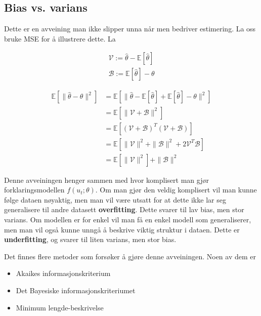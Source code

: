 \subsection{Bias vs. varians}
Dette er en avveining man ikke slipper unna når men bedriver estimering. La oss bruke MSE for å illustrere dette. La 

\begin{equation}
\begin{array}{l}{\mathcal{V}:=\widehat{\theta}-\mathbb{E}[\widehat{\theta}]} \\ {\mathcal{B}:=\mathbb{E}[\widehat{\theta}]-\theta}\end{array}
\end{equation}

\begin{align}
\mathbb{E}\left[\|\hat{\theta}-\theta\|^{2}\right] &=\mathbb{E}\left[\|\widehat{\theta}-\mathbb{E}[\widehat{\theta}]+\mathbb{E}[\widehat{\theta}]-\theta\|^{2}\right] \\ \nonumber
&=\mathbb{E}\left[\|\mathcal{V}+\mathcal{B}\|^{2}\right]\\ \nonumber
&=\mathbb{E}\left[(\mathcal{V}+\mathcal{B})^{T}(\mathcal{V}+\mathcal{B})\right] \\ \nonumber
&=\mathbb{E}\left[\|\mathcal{V}\|^{2}+\|\mathcal{B}\|^{2}+2 \mathcal{V}^{T} \mathcal{B}\right] \\ \nonumber
&=\mathbb{E}\left[\|\mathcal{V}\|^{2}\right]+\|\mathcal{B}\|^{2}
\end{align}

Denne avveiningen henger sammen med hvor komplisert man gjør forklaringsmodellen $f(u_t; \theta)$. Om man gjør den veldig komplisert vil man kunne følge dataen nøyaktig, men man vil være utsatt for at dette ikke lar seg generalisere til andre datasett \textbf{overfitting}. Dette svarer til lav bias, men stor varians. Om modellen er for enkel vil man få en enkel modell som generaliserer, men man vil også kunne unngå å beskrive viktig struktur i dataen. Dette er \textbf{underfitting}, og svarer til liten varians, men stor bias.

Det finnes flere metoder som forsøker å gjøre denne avveiningen. Noen av dem er
\begin{itemize}
\item Akaikes informasjonskriterium
\item Det Bayesiske informasjonskriteriumet
\item Minimum lengde-beskrivelse
\end{itemize}
